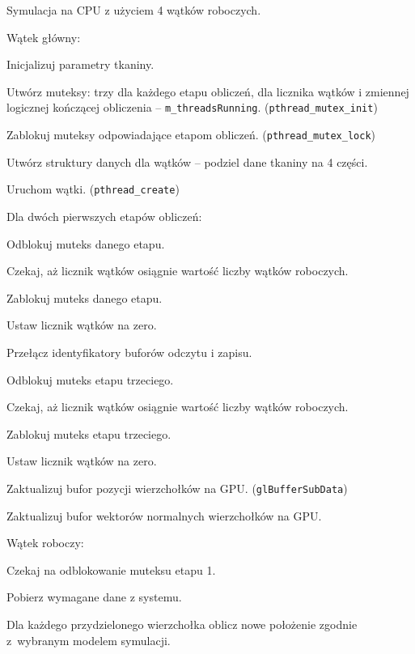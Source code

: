 		\begin{algorithm}[H]
			\label{alg_5_3}
			\caption{Symulacja na CPU z użyciem 4 wątków roboczych.}	
			Wątek główny:
			
			\Indp
			
			Inicjalizuj parametry tkaniny.
			
			Utwórz muteksy: trzy dla każdego etapu obliczeń, dla licznika wątków i zmiennej logicznej kończącej obliczenia -- \texttt{m\_threadsRunning}. (\texttt{pthread\_mutex\_init})
			
			Zablokuj muteksy odpowiadające etapom obliczeń. (\texttt{pthread\_mutex\_lock})
			
			Utwórz struktury danych dla wątków -- podziel dane tkaniny na 4 części.
			
			Uruchom wątki. (\texttt{pthread\_create})
			
			{
				Dla dwóch pierwszych etapów obliczeń:
				
				\Indp
					Odblokuj muteks danego etapu.
					
					Czekaj, aż licznik wątków osiągnie wartość liczby wątków roboczych.
					
					Zablokuj muteks danego etapu.
					
					Ustaw licznik wątków na zero.
					
					Przełącz identyfikatory buforów odczytu i zapisu.
				\Indm
				
				Odblokuj muteks etapu trzeciego.
				
				Czekaj, aż licznik wątków osiągnie wartość liczby wątków roboczych.
				
				Zablokuj muteks etapu trzeciego.
				
				Ustaw licznik wątków na zero.
				
				Zaktualizuj bufor pozycji wierzchołków na GPU. (\texttt{glBufferSubData})
				
				Zaktualizuj bufor wektorów normalnych wierzchołków na GPU.
			}
			
			\Indm
			
			Wątek roboczy:
			
			\Indp
			
			{
				Czekaj na odblokowanie muteksu etapu 1.
				
				Pobierz wymagane dane z systemu.
				
				Dla każdego przydzielonego wierzchołka oblicz nowe położenie zgodnie z~wybranym modelem symulacji.
				
}
\end{algorithm}
